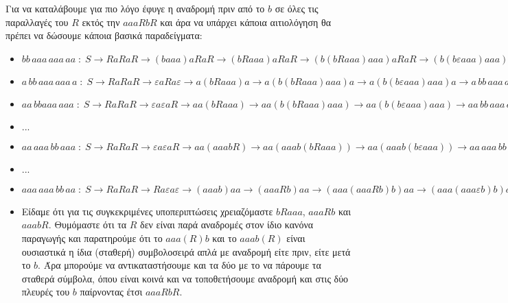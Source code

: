 Για να καταλάβουμε για πιο λόγο έφυγε η αναδρομή πριν από το $b$ σε όλες τις παραλλαγές του $R$ εκτός την $aaaRbR$
και άρα να υπάρχει κάποια αιτιολόγηση θα πρέπει να δώσουμε κάποια βασικά παραδείγματα:\\

\begin{itemize}
	\itemsep0em

	\item $bb\,aaa\,aaa\,aa \;:\; S\rightarrow RaRaR \rightarrow (baaa)aRaR \rightarrow (bRaaa)aRaR \rightarrow
			(b(bRaaa)aaa)aRaR \rightarrow (b(b\varepsilon aaa)aaa)aRaR \rightarrow (bb\,aaa\,aaa)a\varepsilon a
			\varepsilon \rightarrow bb\,aaa\,aaa\,aa$

	\item $a\,bb\,aaa\,aaa\,a \;:\; S\rightarrow RaRaR \rightarrow \varepsilon aRa\varepsilon \rightarrow
	a(bRaaa)a \rightarrow a(b(bRaaa)aaa)a \rightarrow a(b(b\varepsilon aaa)aaa)a \rightarrow a\,bb\,aaa\,aaa\,a$

	\item $aa\,bbaaa\,aaa \;:\; S\rightarrow RaRaR \rightarrow \varepsilon a\varepsilon aR \rightarrow
	aa(bRaaa) \rightarrow aa(b(bRaaa)aaa) \rightarrow aa(b(b\varepsilon aaa)aaa) \rightarrow aa\,bb\,aaa\,aaa$

	\item $...$

	\item $aa\,aaa\,bb\,aaa \;:\; S\rightarrow RaRaR \rightarrow \varepsilon a\varepsilon aR \rightarrow aa(aaabR)
	\rightarrow aa(aaab(bRaaa)) \rightarrow aa(aaab(b\varepsilon aaa)) \rightarrow aa\,aaa\,bb\,aaa$

	\item $...$

	\item $aaa\,aaa\,bb\,aa \;:\; S\rightarrow RaRaR \rightarrow Ra\varepsilon a\varepsilon \rightarrow
	(aaab)aa \rightarrow (aaaRb)aa \rightarrow (aaa(aaaRb)b)aa \rightarrow (aaa(aaa\varepsilon b)b)aa \rightarrow
	aaa\,aaa\,bb\,aa$

	\item Είδαμε ότι για τις συγκεκριμένες υποπεριπτώσεις χρειαζόμαστε $bRaaa$, $aaaRb$ και $aaabR$. Θυμόμαστε ότι
	τα $R$ δεν είναι παρά αναδρομές στον ίδιο κανόνα παραγωγής και παρατηρούμε ότι το $aaa(R)b$ και το $aaab(R)$
	είναι ουσιαστικά η ίδια (σταθερή) συμβολοσειρά απλά με αναδρομή είτε πριν, είτε μετά το $b$. Άρα μπορούμε να
	αντικαταστήσουμε και τα δύο με το να πάρουμε τα σταθερά σύμβολα, όπου είναι κοινά και να τοποθετήσουμε αναδρομή
	και στις δύο πλευρές του $b$ παίρνοντας έτσι $aaaRbR$.


\end{itemize}
